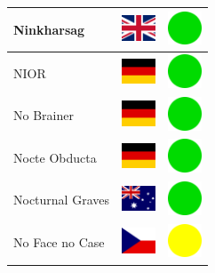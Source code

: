 \documentclass[12pt, a4paper, twoside]{report}
\begin{document}
\begin{center}
\begin{longtable}{|p{5cm}|p{2cm}|p{2cm}|}
 Ninkharsag                                                 & \includegraphics[width=1cm]{../img/flags/gb} &   \includegraphics[width=1cm]{../likes/y} \\ \hline
 NIOR                                                       & \includegraphics[width=1cm]{../img/flags/de} &   \includegraphics[width=1cm]{../likes/y} \\ \hline
 No Brainer                                                 & \includegraphics[width=1cm]{../img/flags/de} &   \includegraphics[width=1cm]{../likes/y} \\ \hline
 Nocte Obducta                                              & \includegraphics[width=1cm]{../img/flags/de} &   \includegraphics[width=1cm]{../likes/y} \\ \hline
 Nocturnal Graves                                           & \includegraphics[width=1cm]{../img/flags/au} &   \includegraphics[width=1cm]{../likes/y} \\ \hline
 No Face no Case                                            & \includegraphics[width=1cm]{../img/flags/cz} &   \includegraphics[width=1cm]{../likes/m} \\ \hline

\end{longtable}
\end{center}
\end{document}
